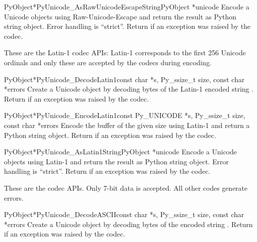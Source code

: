 \begin{cfuncdesc}{PyObject*}{PyUnicode_AsRawUnicodeEscapeString}{PyObject *unicode}
  Encode a Unicode objects using Raw-Unicode-Escape and return the
  result as Python string object. Error handling is ``strict''.
  Return \NULL{} if an exception was raised by the codec.
\end{cfuncdesc}


These are the Latin-1 codec APIs:
Latin-1 corresponds to the first 256 Unicode ordinals and only these
are accepted by the codecs during encoding.

\begin{cfuncdesc}{PyObject*}{PyUnicode_DecodeLatin1}{const char *s,
                                                     Py_ssize_t size,
                                                     const char *errors}
  Create a Unicode object by decoding  bytes of the Latin-1
  encoded string .  Return \NULL{} if an exception was raised
  by the codec.
\end{cfuncdesc}

\begin{cfuncdesc}{PyObject*}{PyUnicode_EncodeLatin1}{const Py_UNICODE *s,
                                                     Py_ssize_t size,
                                                     const char *errors}
  Encode the  buffer of the given size using
  Latin-1 and return a Python string object.  Return \NULL{} if an
  exception was raised by the codec.
\end{cfuncdesc}

\begin{cfuncdesc}{PyObject*}{PyUnicode_AsLatin1String}{PyObject *unicode}
  Encode a Unicode objects using Latin-1 and return the result as
  Python string object.  Error handling is ``strict''.  Return
  \NULL{} if an exception was raised by the codec.
\end{cfuncdesc}


These are the \ASCII{} codec APIs.  Only 7-bit \ASCII{} data is
accepted. All other codes generate errors.

\begin{cfuncdesc}{PyObject*}{PyUnicode_DecodeASCII}{const char *s,
                                                    Py_ssize_t size,
                                                    const char *errors}
  Create a Unicode object by decoding  bytes of the
  \ASCII{} encoded string .  Return \NULL{} if an exception
  was raised by the codec.
\end{cfuncdesc}

